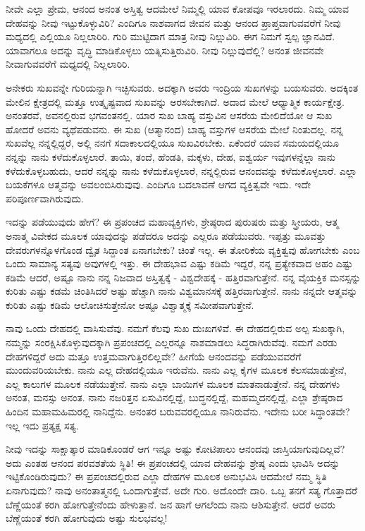 ನೀವೇ ಎಲ್ಲಾ ಪ್ರೇಮ, ಆನಂದ ಅನಂತ ಅಸ್ತಿತ್ವ ಆದಮೇಲೆ ನಿಮ್ಮಲ್ಲಿ ಯಾವ ಕೋಪವೂ ಇರಲಾರದು. ನಿಮ್ಮ ಯಾವ ದೇಹವನ್ನು ನೀವು ಇಟ್ಟುಕೊಳ್ಳುವಿರಿ? ಎಂದಿಗೂ ನಾಶವಾಗದ ಜೀವನ ಮತ್ತು ಆನಂದ ಪ್ರಾಪ್ತವಾಗುವವರೆಗೆ ನೀವು ಮಧ್ಯದಲ್ಲಿ ಎಲ್ಲಿಯೂ ನಿಲ್ಲಲಾರಿರಿ. ಗುರಿ ಮುಟ್ಟಿದಾಗ ಮಾತ್ರ ನೀವು ನಿಲ್ಲುವಿರಿ. ಈಗ ನಿಮಗೆ ಸ್ವಲ್ಪ ಜ್ಞಾನವಿದೆ. ಯಾವಾಗಲೂ ಅದನ್ನು ವೃದ್ಧಿ ಮಾಡಿಕೊಳ್ಳಲು ಯತ್ನಿಸುತ್ತಿರುವಿರಿ. ನೀವು ನಿಲ್ಲುವುದೆಲ್ಲಿ? ಅನಂತ ಜೀವನವೇ ನೀವಾಗುವವರೆಗೆ ಮಧ್ಯದಲ್ಲಿ ನಿಲ್ಲಲಾರಿರಿ.

ಅನೇಕರು ಸುಖವನ್ನೇ ಗುರಿಯನ್ನಾಗಿ ಇಚ್ಛಿಸುವರು. ಅದಕ್ಕಾಗಿ ಅವರು ಇಂದ್ರಿಯ ಸುಖಗಳನ್ನು ಬಯಸುವರು. ಅದಕ್ಕಿಂತ ಮೇಲಿನ ಕ್ಷೇತ್ರದಲ್ಲಿ ಮತ್ತೂ ಉತ್ಕೃಷ್ಟವಾದ ಸುಖವನ್ನು ಅರಸಬೇಕಾಗಿದೆ. ಅದಾದ ಮೇಲೆ ಆಧ್ಯಾತ್ಮಿಕ ಕಾರ್ಯಕ್ಷೇತ್ರ. ಅನಂತರವೆ, ಅವನಲ್ಲಿರುವ ಭಗವಂತನಲ್ಲಿ. ಯಾರ ಸುಖ ಬಾಹ್ಯ ವಸ್ತುವಿನ ಆಸರೆಯ ಮೇಲಿದೆಯೋ ಆ ಸುಖ ಹೋದರೆ ಅವನು ವ್ಯಥೆಪಡುವನು. ಈ ಸುಖ (ಆತ್ಮಾನಂದ) ಬಾಹ್ಯ ವಸ್ತುಗಳ ಆಸರೆಯ ಮೇಲೆ ನಿಂತುದಲ್ಲ. ನನ್ನ ಸುಖವೆಲ್ಲ ನನ್ನಲ್ಲಿದ್ದರೆ, ಅಲ್ಲಿ ನನಗೆ ಸದಾಕಾಲದಲ್ಲಿಯೂ ಸುಖವಿರಬೇಕು. ಏಕೆಂದರೆ ಯಾವ ಸಮಯದಲ್ಲಿಯೂ ನನ್ನನ್ನು ನಾನು ಕಳೆದುಕೊಳ್ಳಲಾರೆ. ತಾಯಿ, ತಂದೆ, ಹೆಂಡತಿ, ಮಕ್ಕಳು, ದೇಹ, ಐಶ್ವರ್ಯ ಇವುಗಳನ್ನೆಲ್ಲಾ ನಾನು ಕಳೆದುಕೊಳ್ಳಬಹುದು, ಆದರೆ ನನ್ನನ್ನು ನಾನು ಕಳೆದುಕೊಳ್ಳಲಾರೆ, ನನ್ನಲ್ಲಿರುವ ಆನಂದವನ್ನು ಕಳೆದುಕೊಳ್ಳಲಾರೆ. ಎಲ್ಲಾ ಬಯಕೆಗಳೂ ಆತ್ಮವನ್ನು ಅವಲಂಬಿಸಿರುವುವು. ಎಂದಿಗೂ ಬದಲಾವಣೆ ಆಗದ ವ್ಯಕ್ತಿತ್ವವೇ ಇದು. ಇದೇ ಪರಿಪೂರ್ಣವಾಗಿರುವುದು.

ಇದನ್ನು ಪಡೆಯುವುದು ಹೇಗೆ? ಈ ಪ್ರಪಂಚದ ಮಹಾವ್ಯಕ್ತಿಗಳು, ಶ್ರೇಷ್ಠರಾದ ಪುರುಷರು ಮತ್ತು ಸ್ತ್ರೀಯರು, ಆತ್ಮ ಅನಾತ್ಮ ವಿವೇಕದ ಮೂಲಕ ಯಾವುದನ್ನು ಪಡೆದರೂ ಅದನ್ನು ಎಲ್ಲರೂ ಪಡೆಯುವರು. ಇಪ್ಪತ್ತು ಮೂವತ್ತು ದೇವರುಗಳನ್ನೊಳಗೊಂಡ ದ್ವೈತ ಸಿದ್ದಾಂತ ಏನಾಗಬೇಕು? ಚಿಂತೆ ಇಲ್ಲ. ಈ ತೋರಿಕೆಯ ವ್ಯಕ್ತಿತ್ವವು ಹೋಗಬೇಕು ಎಂಬ ಒಂದು ಸಾಮಾನ್ಯ ಸತ್ಯವು ಅವುಗಳಲ್ಲಿ ಇತ್ತು. ಈ ದೇಹಭಾವ ಎಷ್ಟು ಕಡಿಮೆ ಇದ್ದರೆ, ನನ್ನ ಪ್ರತ್ಯೇಕವಾದ ಅಹಂ ಎಷ್ಟು ಕಡಿಮೆ ಆದರೆ, ಅಷ್ಟೂ ನಾನು ನನ್ನ ನಿಜವಾದ ಅಸ್ತಿತ್ವಕ್ಕೆ - ವಿಶ್ವದೇಹಕ್ಕೆ - ಹತ್ತಿರವಾಗುತ್ತೇನೆ. ನನ್ನ ವೈಯಕ್ತಿಕ ಮನಸ್ಸನ್ನು ಕುರಿತು ಎಷ್ಟು ಕಡಮೆ ಚಿಂತಿಸಿದರೆ ಅಷ್ಟು ಹೆಚ್ಚಾಗಿ ನಾನು ವಿಶ್ವಮಾನಸಕ್ಕೆ ಹತ್ತಿರವಾಗುತ್ತೇನೆ. ನಾನು ನನ್ನದೇ ಆತ್ಮವನ್ನು ಕುರಿತು ಎಷ್ಟು ಕಡಿಮೆ ಆಲೋಚಿಸುತ್ತೇನೋ ಅಷ್ಟೂ ವಿಶ್ವಾತ್ಮಕ್ಕೆ ಸಮೀಪವಾಗುತ್ತೇನೆ.

ನಾವು ಒಂದು ದೇಹದಲ್ಲಿ ವಾಸಿಸುವೆವು. ನಮಗೆ ಕೆಲವು ಸುಖ ದುಃಖಗಳಿವೆ. ಈ ದೇಹದಲ್ಲಿರುವ ಅಲ್ಪ ಸುಖಕ್ಕಾಗಿ, ನಮ್ಮನ್ನು ಸಂರಕ್ಷಿಸಿಕೊಳ್ಳುವುದಕ್ಕಾಗಿ ಪ್ರಪಂಚದಲ್ಲಿ ಎಲ್ಲರನ್ನೂ ನಾಶಮಾಡಲು ಸಿದ್ಧರಾಗಿರುವೆವು. ನಮಗೆ ಎರಡು ದೇಹಗಳಿದ್ದರೆ ಅದು ಮತ್ತೂ ಉತ್ತಮವಾಗುತ್ತಿರಲಿಲ್ಲವೇ? ಹೀಗೆಯೆ ಆನಂದವನ್ನು ಪಡೆಯುವವರೆಗೆ ಮುಂದುವರಿಯಬೇಕು. ನಾನು ಎಲ್ಲ ದೇಹದಲ್ಲಿಯೂ ಇರುವೆನು. ನಾನು ಎಲ್ಲ ಕೈಗಳ ಮೂಲಕ ಕೆಲಸಮಾಡುತ್ತೇನೆ, ಎಲ್ಲ ಕಾಲುಗಳ ಮೂಲಕ ನಡೆಯುತ್ತೇನೆ. ನಾನು ಎಲ್ಲಾ ಬಾಯಿಗಳ ಮೂಲಕ ಮಾತನಾಡುತ್ತೇನೆ. ನನ್ನ ದೇಹಗಳು ಅನಂತ, ಮನಸ್ಸು ಅನಂತ. ನಾನು ನಜರಿತ್ತನ ಏಸುವಿನಲ್ಲಿದ್ದೆ, ಬುದ್ಧನಲ್ಲಿದ್ದೆ, ಮಹಮ್ಮದನಲ್ಲಿದ್ದೆ, ಎಲ್ಲಾ ಶ್ರೇಷ್ಠರಾದ ಹಿಂದಿನ ಮಹಾಮಹಿಮರಲ್ಲಿ ನಾನಿದ್ದೆನು. ಅನಂತರ ಬರುವವರಲ್ಲಿಯೂ ನಾನಿರುವೆನು. ಇದೇನು ಬರೀ ಸಿದ್ಧಾಂತವೇ? ಇಲ್ಲ ಇದು ಪ್ರತ್ಯಕ್ಷ ಸತ್ಯ.

ನೀವು ಇದನ್ನು ಸಾಕ್ಷಾತ್ಕಾರ ಮಾಡಿಕೊಂಡರೆ ಆಗ ಇನ್ನೂ ಅಷ್ಟು ಕೋಟಿಪಾಲು ಆನಂದವು ಜಾಸ್ತಿಯಾಗುವುದಿಲ್ಲವೆ? ಅದು ಎಂತಹ ಆನಂದ ಪರವಶತೆಯ ಸ್ಥಿತಿ! ಈ ಪ್ರಪಂಚದಲ್ಲಿ ಯಾವ ದೇಹವನ್ನು ಶ್ರೇಷ್ಠ ಎಂದು ಭಾವಿಸಿ ಅದನ್ನು ಇಟ್ಟಿಕೊಂಡಿರುವುದು? ಈ ಪ್ರಪಂಚದಲ್ಲಿರುವ ಎಲ್ಲಾ ದೇಹಗಳ ಮೂಲಕ ಅನುಭವಿಸಿ ಆದಮೇಲೆ ನಮ್ಮ ಸ್ಥಿತಿ ಏನಾಗುವುದು? ನಾವು ಅನಂತಾತ್ಮನಲ್ಲಿ ಒಂದಾಗುತ್ತೇವೆ. ಅದೇ ಗುರಿ. ಅದೊಂದೇ ದಾರಿ. ಒಬ್ಬ ತನಗೆ ಸತ್ಯ ಗೊತ್ತಾದರೆ ಬೆಣ್ಣೆಯಂತೆ ಕರಗಿ ಹೋಗುತ್ತೇನೆಂದು ಹೇಳುತ್ತಾನೆ. ಜನ ಹಾಗೆ ಆಗಲೆಂದು ನಾನು ಆಶಿಸುತ್ತೇನೆ. ಆದರೆ ಅವರು ಬೆಣ್ಣೆಯಂತೆ ಕರಗಿ ಹೋಗುವುದು ಅಷ್ಟು ಸುಲಭವಲ್ಲ!

